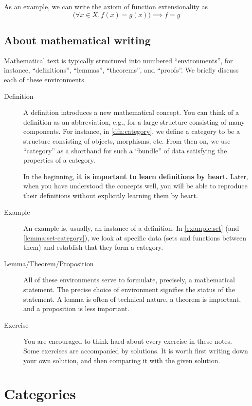 \documentclass[a4paper,11pt, oneside,titlepage=false]{scrbook}
\theoremstyle{plain}
\theoremstyle{definition}
\begin{document}
As an example, we can write the axiom of function extensionality as
\[ \big(\forall x \in X, f(x) = g(x)\big) \implies f = g \]


\section{About mathematical writing}

Mathematical text is typically structured into numbered ``environments'', for instance, ``definitions'', ``lemmas'', ``theorems'', and ``proofs''.
We briefly discuss each of these environments.

\begin{description}
\item[Definition] A definition introduces a new mathematical concept. You can think of a definition as an abbreviation, e.g., for a large structure consisting of many components.
  For instance, in \cref{dfn:category}, we define a category to be a structure consisting of objects, morphisms, etc.
  From then on, we use ``category'' as a shorthand for such a ``bundle'' of data satisfying the properties of a category.

  In the beginning, \textbf{it is important to learn definitions by heart.} Later, when you have understood the concepts well, you will be able to reproduce their definitions without explicitly learning them by heart.
\item[Example] An example is, usually, an instance of a definition. In \cref{example:set} (and \cref{lemma:set-category}), we look at specific data (sets and functions between them) and establish that they form a category.
\item[Lemma/Theorem/Proposition] All of these environments serve to formulate, precisely, a mathematical statement.
  The precise choice of environment signifies the status of the statement.
  A lemma is often of technical nature, a theorem is important, and a proposition is less important.
\item[Exercise] You are encouraged to think hard about every exercise in these notes. Some exercises are accompanied by solutions. It is worth first writing down your own solution, and then comparing it with the given solution.
\end{description}



\chapter{Categories}
\label{sec:categories}
\end{document}
